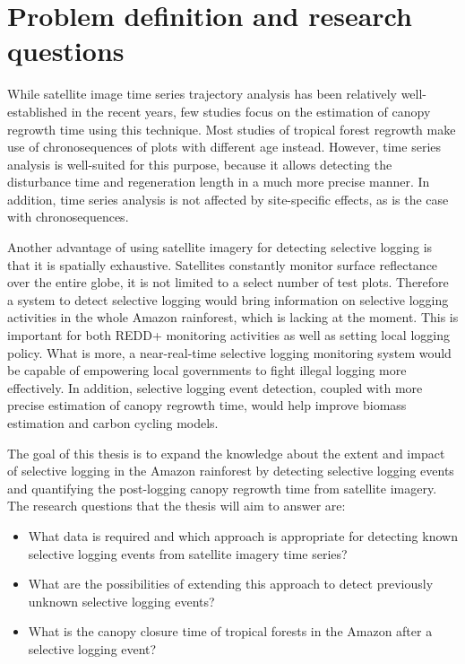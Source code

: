 \documentclass[a4paper,10pt]{article}
\begin{document}
\section{Problem definition and research questions}

While satellite image time series trajectory analysis has been relatively well-established in the recent years, few studies focus on the estimation of canopy regrowth time using this technique. Most studies of tropical forest regrowth make use of chronosequences of plots with different age instead. However, time series analysis is well-suited for this purpose, because it allows detecting the disturbance time and regeneration length in a much more precise manner. In addition, time series analysis is not affected by site-specific effects, as is the case with chronosequences.

Another advantage of using satellite imagery for detecting selective logging is that it is spatially exhaustive. Satellites constantly monitor surface reflectance over the entire globe, it is not limited to a select number of test plots. Therefore a system to detect selective logging would bring information on selective logging activities in the whole Amazon rainforest, which is lacking at the moment. This is important for both \ac{REDD+} monitoring activities as well as setting local logging policy. What is more, a near-real-time selective logging monitoring system would be capable of empowering local governments to fight illegal logging more effectively. In addition, selective logging event detection, coupled with more precise estimation of canopy regrowth time, would help improve biomass estimation and carbon cycling models.

The goal of this thesis is to expand the knowledge about the extent and impact of selective logging in the Amazon rainforest by detecting selective logging events and quantifying the post-logging canopy regrowth time from satellite imagery. The research questions that the thesis will aim to answer are:

\begin{itemize}
 \item What data is required and which approach is appropriate for detecting known selective logging events from satellite imagery time series?
 \item What are the possibilities of extending this approach to detect previously unknown selective logging events?
 \item What is the canopy closure time of tropical forests in the Amazon after a selective logging event?
\end{itemize}
\end{document}
